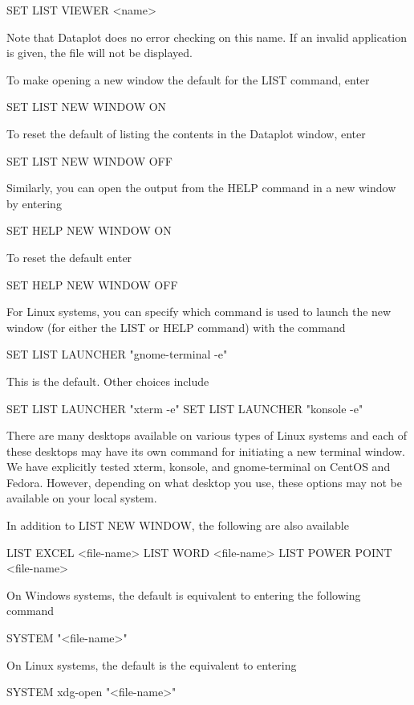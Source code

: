           SET LIST VIEWER <name>

       Note that Dataplot does no error checking on this name.  If
       an invalid application is given, the file will not be displayed.

       To make opening a new window the default for the LIST command,
       enter

          SET LIST NEW WINDOW ON

       To reset the default of listing the contents in the Dataplot
       window, enter

          SET LIST NEW WINDOW OFF

       Similarly, you can open the output from the HELP command in a
       new window by entering

          SET HELP NEW WINDOW ON

       To reset the default enter

          SET HELP NEW WINDOW OFF

       For Linux systems, you can specify which command is used
       to launch the new window (for either the LIST or HELP
       command) with the command

          SET LIST LAUNCHER  "gnome-terminal -e"

       This is the default.  Other choices include

          SET LIST LAUNCHER  "xterm -e"
          SET LIST LAUNCHER  "konsole -e"

       There are many desktops available on various types of Linux
       systems and each of these desktops may have its own
       command for initiating a new terminal window.  We have
       explicitly tested xterm, konsole, and gnome-terminal on
       CentOS and Fedora.  However, depending on what desktop you
       use, these options may not be available on your local system.

       In addition to LIST NEW WINDOW, the following are also available

          LIST EXCEL <file-name>
          LIST WORD <file-name>
          LIST POWER POINT <file-name>

       On Windows systems, the default is equivalent to entering
       the following command

             SYSTEM "<file-name>"

       On Linux systems, the default is the equivalent to entering

             SYSTEM xdg-open "<file-name>"

